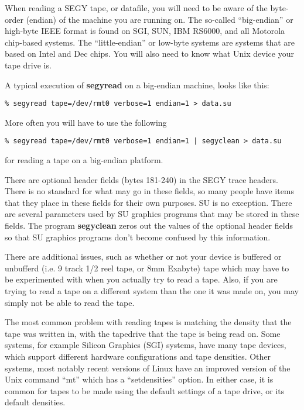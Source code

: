{{{When reading a SEGY tape, or datafile, you will need to be aware of
the byte-order (endian) of the machine you are running on.
The so-called ``big-endian'' or high-byte IEEE format is found on SGI,
SUN, IBM RS6000, and all Motorola chip-based systems. 
The ``little-endian'' or low-byte systems are systems that are based
on Intel and Dec chips.
You will also need to know what Unix device your tape drive is.

A typical execution of {\bf segyread\/} on a big-endian machine, 
looks like this:
{\small\begin{verbatim}
% segyread tape=/dev/rmt0 verbose=1 endian=1 > data.su
\end{verbatim}}\noindent

More often you will have to use the following
{\small\begin{verbatim}
% segyread tape=/dev/rmt0 verbose=1 endian=1 | segyclean > data.su
\end{verbatim}}\noindent
for reading a tape on a big-endian platform.

There are optional header fields (bytes 181-240) in the SEGY trace
headers. There is no standard for what may go in these fields, so
many people have items that they place in these fields for their
own purposes. SU is no exception. There are several parameters 
used by SU graphics programs that may be stored in these fields.
The program {\bf segyclean\/} zeros out the values of the optional header 
fields so that SU graphics programs don't become confused by this information.

There are additional issues, such as whether or not your device
is buffered or unbufferd (i.e. 9 track 1/2 reel tape, or 8mm Exabyte)
tape which may have to be experimented with when you actually
try to read a tape.
Also, if you are trying to read a tape on a different system than
the one it was made on, you may simply not be able to read the tape.

The most common problem with reading tapes is matching the density
that the tape was written in, with the tapedrive that the tape is
being read on.
Some systems, for example Silicon Graphics (SGI) systems, have
many tape devices, which support different hardware configurations
and tape densities.
Other systems, most
notably recent versions of Linux have an improved version of the Unix
command ``mt'' which has a ``setdensities'' option.
In either case, it is common for tapes to be made using the default
settings of a tape drive, or its default densities. 

}}}
